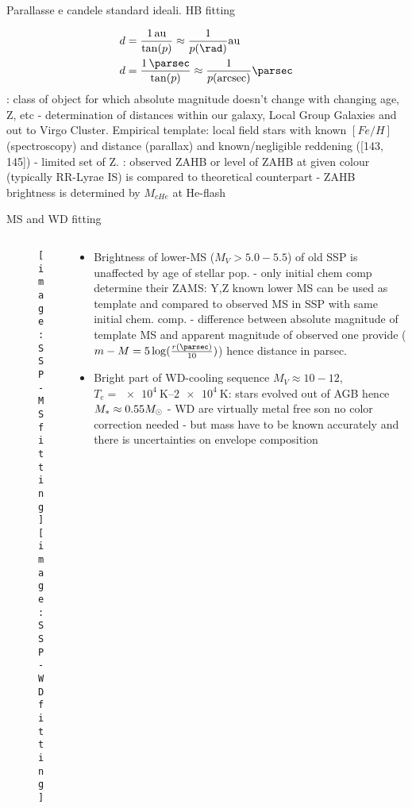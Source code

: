 \begin{frame}{Parallasse e candele standard ideali. HB fitting}

\begin{align*}
&d=\frac{\SI{1}{\astronomicalunit}}{\tan(p)}\approx\frac{1}{p(\si{\rad})}\si{\astronomicalunit}\\
&d=\frac{\SI{1}{\parsec}}{\tan(p)}\approx\frac{1}{p(\si{\arcsec})}\si{\parsec}
\end{align*}
: class of object for which absolute magnitude doesn't change with changing age, Z, etc - determination of distances within our galaxy, Local Group Galaxies and out to Virgo Cluster.
Empirical template: local field stars with known $[Fe/H]$ (spectroscopy) and distance (parallax) and known/negligible reddening ([143, 145]) - limited set of Z.
: observed ZAHB or level of ZAHB at given colour (typically RR-Lyrae IS) is compared to theoretical counterpart - ZAHB brightness is determined by $M_{cHe}$ at He-flash
\end{frame}

\begin{frame}{MS and WD fitting}
\begin{columns}[T]
	\begin{column}{0.5\textwidth}
		\begin{figure}[!ht]
			\texttt{[image: SSP-MSfitting]}\label{fig:SSP-MSfitting}
			\texttt{[image: SSP-WDfitting]}\label{fig:SSP-WDfitting}
		\end{figure}
	\end{column}
	\begin{column}{0.5\textwidth}
		\begin{itemize}
			\item Brightness of lower-MS ($M_V>5.0-5.5$) of old SSP is unaffected by age of stellar pop. - only initial chem comp determine their ZAMS: Y,Z known lower MS can be used as template and compared to observed MS in SSP with same initial chem. comp. - difference between absolute magnitude of template MS and apparent magnitude of observed one provide  ($m-M=5\log(\frac{r(\si{\parsec})}{10})$) hence distance in parsec.
			\item Bright part of WD-cooling sequence $M_V\approx10-12$, $T_e=\SIrange{e4}{2e4}{\kelvin}$: stars evolved out of AGB hence $M_*\approx0.55M_{\odot}$ - WD are virtually metal free son no color correction needed - but mass have to be known accurately and there is uncertainties on envelope composition
		\end{itemize}
	\end{column}
\end{columns}
\end{frame}

